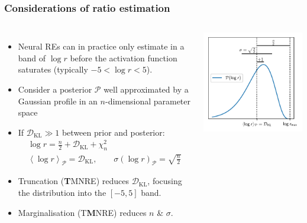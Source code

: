 \documentclass[aspectratio=169]{beamer}
\begin{document}
\appendix

\begin{frame}
    \frametitle{Considerations of ratio estimation}
    \begin{columns}
        \begin{itemize}
            \item Neural REs can in practice only estimate in a band of $\log r$ before the activation function saturates (typically $-5 < \log r < 5$).
            \item Consider a posterior $\mathcal{P}$ well approximated by a Gaussian profile in an $n$-dimensional parameter space~
            \item If $\mathcal{D}_\text{KL}\gg1$ between prior and posterior:
                \begin{gather*}
                    \log r = \frac{n}{2} + \mathcal{D}_\text{KL} + \chi^2_{n} \\
                    \left\langle \log r \right\rangle_\mathcal{P} = \mathcal{D}_\text{KL}, \qquad \sigma(\log r)_\mathcal{P} = \sqrt{\frac{n}{2}}
                \end{gather*}
            \item Truncation ({\bf T}MNRE) reduces $\mathcal{D}_\text{KL}$, focusing the distribution into the $[-5,5]$ band.
            \item Marginalisation (T{\bf M}NRE) reduces $n$ \& $\sigma$.
        \end{itemize}
        \vspace{10pt}
        \includegraphics{figures/anatomy}
    \end{columns}
\end{frame}
\end{document}
